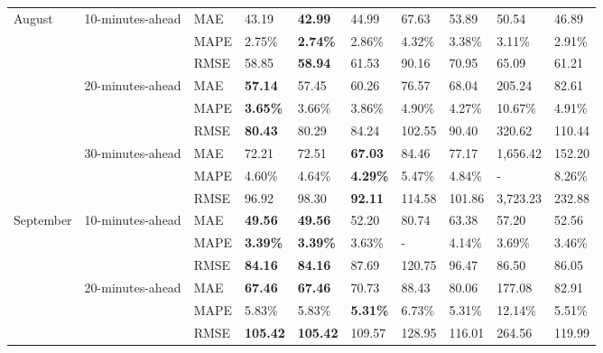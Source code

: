 {\begin{longtable}[htb!]{llllllllll}
{August} &
  {10-minutes-ahead} &
  MAE &
  43.19 &
  \textbf{42.99} &
  44.99 &
  67.63 &
  53.89 &
  50.54 &
  46.89 \\
 &                                   & MAPE & 2.75\%          & \textbf{2.74\%} & 2.86\%          & 4.32\%  & 3.38\%          & 3.11\%   & 2.91\% \\
 &                                   & RMSE & 58.85           & \textbf{58.94}  & 61.53           & 90.16   & 70.95           & 65.09    & 61.21  \\ \cline{2-10}
 & {20-minutes-ahead} & MAE  & \textbf{57.14}  & 57.45           & 60.26           & 76.57   & 68.04           & 205.24   & 82.61  \\
 &                                   & MAPE & \textbf{3.65\%} & 3.66\%          & 3.86\%          & 4.90\%  & 4.27\%          & 10.67\%  & 4.91\% \\
 &                                   & RMSE & \textbf{80.43}  & 80.29           & 84.24           & 102.55  & 90.40           & 320.62   & 110.44 \\ \cline{2-10}
 & {30-minutes-ahead} & MAE  & 72.21           & 72.51           & \textbf{67.03}  & 84.46   & 77.17           & 1,656.42 & 152.20 \\
 &                                   & MAPE & 4.60\%          & 4.64\%          & \textbf{4.29\%} & 5.47\%  & 4.84\%          & -        & 8.26\% \\
 &                                   & RMSE & 96.92           & 98.30           & \textbf{92.11}  & 114.58  & 101.86          & 3,723.23 & 232.88 \\ \hline
{September} &
  {10-minutes-ahead} &
  MAE &
  \textbf{49.56} &
  \textbf{49.56} &
  52.20 &
  80.74 &
  63.38 &
  57.20 &
  52.56 \\
 &                                   & MAPE & \textbf{3.39\%} & \textbf{3.39\%} & 3.63\%          & -       & 4.14\%          & 3.69\%   & 3.46\% \\
 &                                   & RMSE & \textbf{84.16}  & \textbf{84.16}  & 87.69           & 120.75  & 96.47           & 86.50    & 86.05  \\ \cline{2-10}
 &
  {20-minutes-ahead} &
  MAE &
  \textbf{67.46} &
  \textbf{67.46} &
  70.73 &
  88.43 &
  80.06 &
  177.08 &
  82.91 \\
 &                                   & MAPE & 5.83\%          & 5.83\%          & \textbf{5.31\%} & 6.73\%  & 5.31\%          & 12.14\%  & 5.51\% \\
 &                                   & RMSE & \textbf{105.42} & \textbf{105.42} & 109.57          & 128.95  & 116.01          & 264.56   & 119.99 \\ \cline{2-10}

\end{longtable}}

